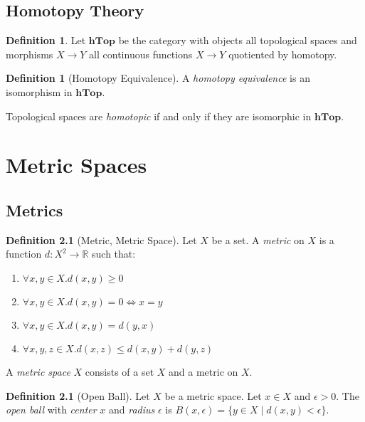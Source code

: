 \documentclass{book}
\theoremstyle{definition}
\newtheorem{definition}[lemma]{Definition}
\newcommand{\Real}{\ensuremath{\mathbb{R}}}
\begin{document}
\section{Homotopy Theory}

\begin{definition}
    Let $\mathbf{hTop}$ be the category with objects all topological spaces and morphisms $X \rightarrow Y$
    all continuous functions $X \rightarrow Y$ quotiented by homotopy.
\end{definition}

\begin{definition}[Homotopy Equivalence]
    A \emph{homotopy equivalence} is an isomorphism in $\mathbf{hTop}$.

    Topological spaces are \emph{homotopic} if and only if they are isomorphic in $\mathbf{hTop}$.
\end{definition}

\chapter{Metric Spaces}

\section{Metrics}

\begin{definition}[Metric, Metric Space]
    Let $X$ be a set. A \emph{metric} on $X$ is a function $d : X^2 \rightarrow \Real$ such that:
    \begin{enumerate}
        \item $\forall x,y \in X. d(x,y) \geq 0$
        \item $\forall x,y \in X. d(x,y) = 0 \Leftrightarrow x = y$
        \item $\forall x,y \in X. d(x,y) = d(y,x)$
        \item $\forall x,y,z \in X. d(x,z) \leq d(x,y) + d(y,z)$
    \end{enumerate}

    A \emph{metric space} $X$ consists of a set $X$ and a metric on $X$.
\end{definition}

\begin{definition}[Open Ball]
    Let $X$ be a metric space. Let $x \in X$ and $\epsilon > 0$. The \emph{open ball} with \emph{center} $x$
    and \emph{radius} $\epsilon$ is $B(x, \epsilon) = \{ y \in X \mid d(x,y) < \epsilon \}$.
\end{definition}
\end{document}
